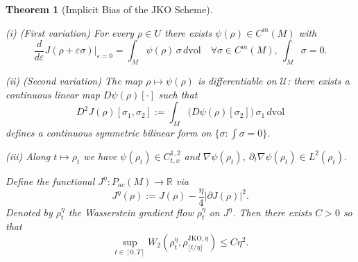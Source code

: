 \documentclass[reqno,11pt,letterpaper]{amsart}
\theoremstyle{plain}
\newtheorem{theorem}{Theorem}
\theoremstyle{definition}
\theoremstyle{remark}
\newcommand{\abs}[1]{\left|#1\right|}
\newcommand{\gives}{\rightarrow}
\newcommand{\R}{\mathbb R}
\newcommand{\lr}[1]{\left(#1\right)}
\begin{document}
\begin{theorem}[Implicit Bias of the JKO Scheme]
\begin{itemize}
(i) (First variation) For every $\rho\in U$ there exists
$\psi(\rho)\in C^{m}(M)$ with
\[
\frac{d}{d\varepsilon} J(\rho+\varepsilon\sigma)\Big|_{\varepsilon=0}
= \int_M \psi(\rho)\,\sigma\,d\mathrm{vol}
\quad \forall \sigma\in C^{m}(M),\ \int_M\sigma=0.
\]

(ii) (Second variation) The map $\rho\mapsto \psi(\rho)$ is differentiable on
$\mathcal U$: there exists a continuous linear map
$D\psi(\rho)[\cdot]$ such that
\[
D^2J(\rho)[\sigma_1,\sigma_2]
:=\int_M \big(D\psi(\rho)[\sigma_2]\big)\,\sigma_1\,d\mathrm{vol}
\]
defines a continuous symmetric bilinear form on $\{\sigma:\int\sigma=0\}$.

(iii) Along $t\mapsto\rho_t$ we have $\psi(\rho_t)\in C^{1,2}_{t,x}$ and
$\nabla\psi(\rho_t),\ \partial_t\nabla\psi(\rho_t)\in L^2(\rho_t)$.
    \end{itemize}
    Define the functional $J^\eta:P_{ac}(M)\gives \R$ via 
    \begin{equation}\label{eq:JKO-bias}
    J^\eta(\rho) := J(\rho)-\frac{\eta}{4}\abs{\partial J(\rho)}^2.
    \end{equation}
    Denoted by $\rho_t^\eta$ the Wasserstein gradient flow $\rho_t^\eta$ on $J^\eta$. Then there exists $C>0$ so that 
    \begin{equation}\label{eq:JKO-approx}
        \sup_{t\in [0,T]} W_2\lr{\rho_t^\eta, \rho_{\lfloor t/\eta \rfloor}^{\mathrm{JKO}, \eta}} \leq C \eta^2.
    \end{equation}

    \end{theorem}
\end{document}
